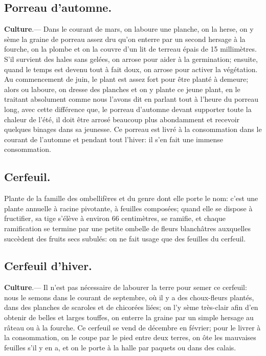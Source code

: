 \documentclass[10pt,a4paper]{book}
\begin{document}
\subsection{Porreau d'automne.}

\textbf{Culture}.--- Dans le courant de mars, on laboure une planche, on la herse, on y sème la graine de porreau assez dru qu'on enterre par un second hersage à la fourche, on la plombe et on la couvre d'un lit de terreau épais de 15 millimètres. S'il survient des hales sans gelées, on arrose pour aider à la germination; ensuite, quand le temps est devenu tout à fait doux, on arrose pour activer la végétation. Au commencement de juin, le plant est assez fort pour être planté à demeure; alors ou laboure, on dresse des planches et on y plante ce jeune plant, en le traitant absolument comme nous l'avons dit en parlant tout à l'heure du porreau long, avec cette différence que, le porreau d'automne devant supporter toute la chaleur de l'été, il doit être arrosé beaucoup plus abondamment et recevoir quelques binages dans sa jeunesse. Ce porreau est livré à la consommation dans le courant de l'automne et pendant tout l'hiver: il s'en fait une immense consommation.

\subsection{Cerfeuil.}

Plante de la famille des ombellifères et du genre dont elle porte le nom: c'est une plante annuelle à racine pivotante, à feuilles composées; quand elle se dispose à fructifier, sa tige s'élève à environ 66 centimètres, se ramifie, et chaque ramification se termine par une petite ombelle de fleurs blanchâtres auxquelles succèdent des fruits secs subulés: on ne fait usage que des feuilles du cerfeuil.

\subsection{Cerfeuil d'hiver.}

\textbf{Culture}.--- Il n'est pas nécessaire de labourer la terre pour semer ce cerfeuil: nous le semons dans le courant de septembre, où il y a des choux-fleurs plantés, dans des planches de scaroles et de chicorées liées; on l'y sème très-clair afin d'en obtenir de belles et larges touffes, on enterre la graine par un simple hersage au râteau ou à la fourche. Ce cerfeuil se vend de décembre en février; pour le livrer à la consommation, on le coupe par le pied entre deux terres, on ôte les mauvaises feuilles s'il y en a, et on le porte à la halle par paquets ou dans des calais.
\end{document}
